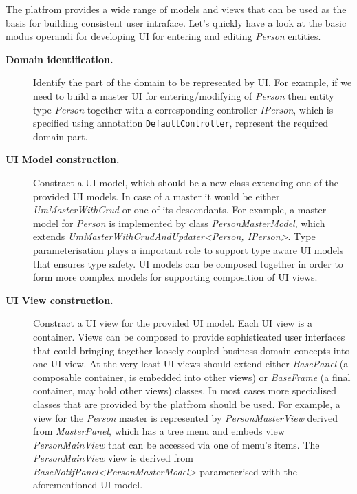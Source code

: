   The platfrom provides a wide range of models and views that can be used as the basis for building consistent user intraface.
  Let's quickly have a look at the basic modus operandi for developing UI for entering and editing \emph{Person} entities.
  \begin{description}
    \item[\textbf{Domain identification.}] Identify the part of the domain to be represented by UI. 
	For example, if we need to build a master UI for entering/modifying of \emph{Person} then entity type \emph{Person} together with a corresponding controller \emph{IPerson}, which is specified using annotation \texttt{DefaultController}, represent the required domain part.
    \item [\textbf{UI Model construction.}] Constract a UI model, which should be a new class extending one of the provided UI models. 
	In case of a master it would be either \emph{UmMasterWithCrud} or one of its descendants. 
	For example, a master model for \emph{Person} is implemented by class \emph{PersonMasterModel}, which extends \emph{UmMasterWithCrudAndUpdater\textless Person, IPerson\textgreater}. 
	Type parameterisation plays a important role to support type aware UI models that ensures type safety.
	UI models can be composed together in order to form more complex models for supporting composition of UI views.
    \item[\textbf{UI View construction.}] Constract a UI view for the provided UI model. 
	Each UI view is a container. 
	Views can be composed to provide sophisticated user interfaces that could bringing together loosely coupled business domain concepts into one UI view.
	At the very least UI views should extend either \emph{BasePanel} (a composable container, is embedded into other views) or \emph{BaseFrame} (a final container, may hold other views) classes. 
	In most cases more specialised classes that are provided by the platfrom should be used.
	For example, a view for the \emph{Person} master is represented by \emph{PersonMasterView} derived from \emph{MasterPanel}, which has a tree menu and embeds view \emph{PersonMainView} that can be accessed via one of menu's items.
	The \emph{PersonMainView} view is derived from \emph{BaseNotifPanel\textless PersonMasterModel\textgreater} parameterised with the aforementioned UI model.
  \end{description}
  
